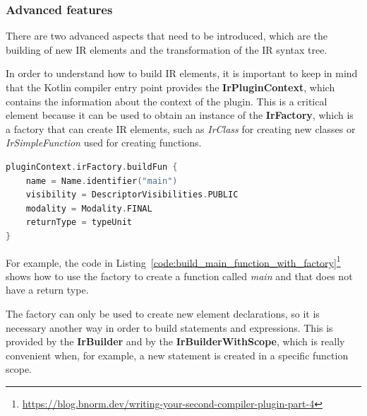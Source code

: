 \subsubsection{Advanced features}\label{section:compiler_plugin_advaced}
There are two advanced aspects that need to be introduced, which are the building of new IR elements and the transformation of the IR syntax tree.

In order to understand how to build IR elements, it is important to keep in mind that the Kotlin compiler entry point provides the \textbf{IrPluginContext}, which contains the information about the context of the plugin. This is a critical element because it can be used to obtain an instance of the \textbf{IrFactory}, which is a factory that can create IR elements, such as \textit{IrClass} for creating new classes or \textit{IrSimpleFunction} used for creating functions.\newline
\begin{lstlisting}[caption={Main function IR building by using the IrFactory}, captionpos=b, language=Kotlin, label={code:build_main_function_with_factory}]
pluginContext.irFactory.buildFun {
    name = Name.identifier("main")
    visibility = DescriptorVisibilities.PUBLIC
    modality = Modality.FINAL
    returnType = typeUnit
}        
\end{lstlisting}
For example, the code in Listing~\ref{code:build_main_function_with_factory}\footnote{\url{https://blog.bnorm.dev/writing-your-second-compiler-plugin-part-4}} shows how to use the factory to create a function called \textit{main} and that does not have a return type.

The factory can only be used to create new element declarations, so it is necessary another way in order to build statements and expressions. This is provided by the \textbf{IrBuilder} and by the \textbf{IrBuilderWithScope}, which is really convenient when, for example, a new statement is created in a specific function scope.

